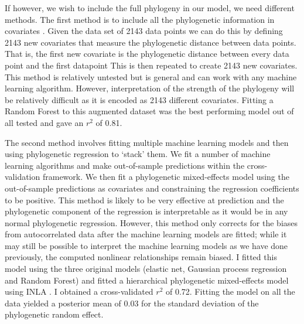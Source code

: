 \documentclass[10pt,]{article}
\begin{document}
If however, we wish to include the full phylogeny in our model, we need different methods.
The first method is to include all the phylogenetic information in covariates \citep{hengl2018random}.
Given the data set of 2143 data points we can do this by defining 2143 new covariates that measure the phylogenetic distance between data points.
That is, the first new covariate is the phylogenetic distance between every data point and the first datapoint
This is then repeated to create 2143 new covariates.
This method is relatively untested but is general and can work with any machine learning algorithm.
However, interpretation of the strength of the phylogeny will be relatively difficult as it is encoded as 2143 different covariates.
Fitting a Random Forest to this augmented dataset was the best performing model out of all tested and gave an \(r^2\) of 0.81.

The second method involves fitting multiple machine learning models and then using phylogenetic regression to `stack' them.
We fit a number of machine learning algorithms and make out-of-sample predictions within the cross-validation framework.
We then fit a phylogenetic mixed-effects model using the out-of-sample predictions as covariates and constraining the regression coefficients to be positive.
This method is likely to be very effective at prediction and the phylogenetic component of the regression is interpretable as it would be in any normal phylogenetic regression.
However, this method only corrects for the biases from autocorrelated data after the machine learning models are fitted; while it may still be possible to interpret the machine learning models as we have done previously, the computed nonlinear relationships remain biased.
I fitted this model using the three original models (elastic net, Gaussian process regression and Random Forest) and fitted a hierarchical phylogenetic mixed-effects model using INLA \citep{INLA}.
I obtained a cross-validated \(r^2\) of 0.72.
Fitting the model on all the data yielded a posterior mean of 0.03 for the standard deviation of the phylogenetic random effect.
\end{document}
